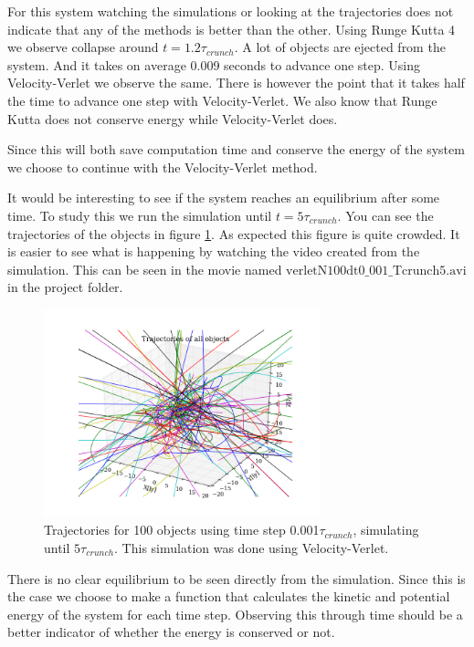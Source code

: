 \documentclass{aa}   %
\begin{document}
For this system watching the simulations or looking at the trajectories does not indicate that any of the methods is better than the other. 
Using Runge Kutta 4 we observe collapse around $t=1.2\tau_{crunch}$.
A lot of objects are ejected from the system. And it takes on average 0.009 seconds to advance one step.
Using Velocity-Verlet we observe the same.
There is however the point that it takes half the time to advance one step with Velocity-Verlet. 
We also know that Runge Kutta does not conserve energy while Velocity-Verlet does.

Since this will both save computation time and conserve the energy of the system we choose to continue with the Velocity-Verlet method.

It would be interesting to see if the system reaches an equilibrium after some time. To study this we run the simulation until $t=5\tau_{crunch}$. You can see the trajectories of the objects in figure \ref{verletN100dt0_001_Tcrunch5}. As expected this figure is quite crowded. It is easier to see what is happening by watching the video created from the simulation. This can be seen in the movie named $\mathrm{verletN100dt0\_001\_Tcrunch5.avi}$ in the project folder.

\begin{figure}[hbtp]
 \centering
 \includegraphics[width=80mm]{verletN100dt0_001_Tcrunch5.png}
 \caption[]{\label{verletN100dt0_001_Tcrunch5}
   Trajectories for 100 objects using time step 0.001$\tau_{crunch}$, simulating until $5\tau_{crunch}$. This simulation was done using Velocity-Verlet.
 }
\end{figure}

There is no clear equilibrium to be seen directly from the simulation. Since this is the case we choose to make a function that calculates the kinetic and potential energy of the system for each time step. Observing this through time should be a better indicator of whether the energy is conserved or not.
\end{document}
